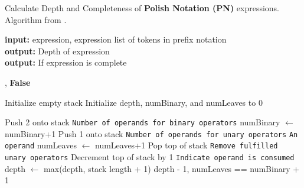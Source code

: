 \documentclass[runningheads]{llncs}
\begin{document}
\begin{algorithm}
\scriptsize
\caption{Calculate Depth and Completeness of \textbf{Polish Notation (PN)} expressions. Algorithm from \cite{77180279}.}
\label{alg:getPNdepth}
\hspace*{\algorithmicindent} \textbf{input:}  expression, expression list of tokens in prefix notation \\
\hspace*{\algorithmicindent} \textbf{output:} Depth of expression\\
\hspace*{\algorithmicindent} \textbf{output:} If expression is complete 
\begin{algorithmic}[1] 
        \State {}, \textbf{False}
    \EndIf

    \State Initialize empty stack
    \State Initialize depth, numBinary, and numLeaves to 0

            \State Push 2 onto stack   \Comment\texttt{{Number of operands for binary operators}}
            \State numBinary $\gets$ numBinary+1
            \State Push 1 onto stack  \Comment\texttt{{Number of operands for unary operators}}
        \Else  \Comment\texttt{{An operand}}
            \State numLeaves $\gets$ numLeaves+1
                \State Pop top of stack \Comment\texttt{{Remove fulfilled unary operators}}
            \EndWhile
                \State Decrement top of stack by 1 \Comment\texttt{{Indicate operand is consumed}}
            \EndIf
        \EndIf
        \State  depth $\gets$ max(depth, stack length + 1)
    \EndFor
    \State \Return depth - 1, numLeaves == numBinary + 1 
\EndFunction
\end{algorithmic}
\end{algorithm}
\end{document}

